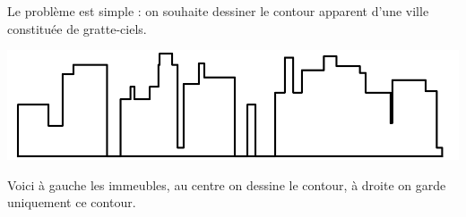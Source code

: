 \documentclass[11pt,class=report,crop=false]{standalone}
\begin{document}

\begin{activite}[Skyline]
	
	
	
	Le problème est simple : on souhaite dessiner le contour apparent d'une ville constituée de gratte-ciels.	
\begin{center}
	\includegraphics[scale=\myscale,scale=0.3]{ecran-skyline-9}
\end{center}	

  Voici à gauche les immeubles, au centre on dessine le contour, à droite on garde uniquement ce contour.
  

\end{activite}
\end{document}
